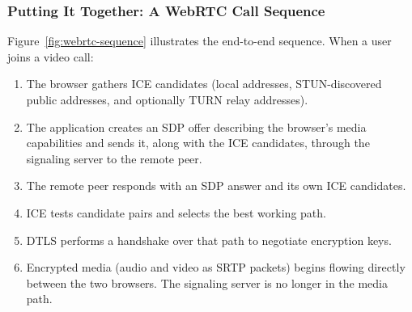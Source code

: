 \documentclass[11pt]{article}
\begin{document}
\subsubsection{Putting It Together: A WebRTC Call Sequence}

Figure~\ref{fig:webrtc-sequence} illustrates the end-to-end sequence.
When a user joins a video call:

\begin{enumerate}
  \item The browser gathers ICE candidates (local addresses, STUN-discovered
    public addresses, and optionally TURN relay addresses).
  \item The application creates an SDP offer describing the browser's media
    capabilities and sends it, along with the ICE candidates, through the
    signaling server to the remote peer.
  \item The remote peer responds with an SDP answer and its own ICE
    candidates.
  \item ICE tests candidate pairs and selects the best working path.
  \item DTLS performs a handshake over that path to negotiate encryption
    keys.
  \item Encrypted media (audio and video as SRTP packets) begins flowing
    directly between the two browsers.  The signaling server is no longer
    in the media path.
\end{enumerate}
\end{document}
